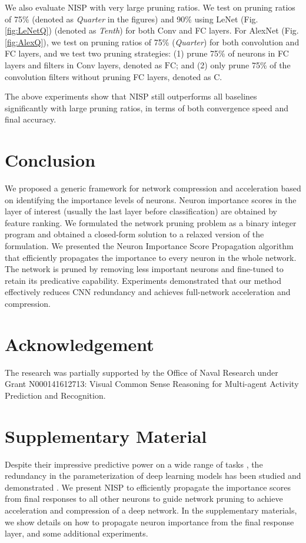 \documentclass[10pt,twocolumn,letterpaper]{article}
\begin{document}
We also evaluate NISP with very large pruning ratios. We test on pruning ratios of 75\% (denoted as \emph{Quarter} in the figures) and 90\% using LeNet (Fig. \ref{fig:LeNetQ}) (denoted as \emph{Tenth}) for both Conv and FC layers.
For AlexNet (Fig. \ref{fig:AlexQ}), we test on pruning ratios of 75\% (\emph{Quarter}) for both convolution and FC layers, and we test two pruning strategies: (1) prune 75\% of neurons in FC layers and filters in Conv layers, denoted as \emph{$\text{FC}$}; and (2) only prune 75\% of the convolution filters without pruning FC layers, denoted as \emph{$\text{C}$}.

The above experiments show that NISP still outperforms all baselines significantly with large pruning ratios, in terms of both convergence speed and final accuracy.



\section{Conclusion}
We proposed a generic framework for network compression and acceleration based on identifying the importance levels of neurons. Neuron importance scores in the layer of interest (usually the last layer before classification) are obtained by feature ranking. We formulated the network pruning problem as a binary integer program and obtained a closed-form solution to a relaxed version of the formulation. We presented the Neuron Importance Score Propagation algorithm that efficiently propagates the importance to every neuron in the whole network. The network is pruned by removing less important neurons and fine-tuned to retain its predicative capability. Experiments demonstrated that our method effectively reduces CNN redundancy and achieves full-network acceleration and compression.

\section*{Acknowledgement}
The research was partially supported by the Office of Naval Research under Grant N000141612713: Visual Common Sense Reasoning for Multi-agent Activity Prediction and Recognition.

\section{Supplementary Material}

Despite their impressive predictive power on a wide range of tasks \cite{faster, xu1,xu3,yu1,yu2,peng,yu3,yu6,yu7,xu2,yu4,yu5}, the redundancy in the parameterization of deep learning models has been studied and demonstrated \cite{PredictingParameters}. We present NISP to efficiently propagate the importance scores from final responses to all other neurons to guide network pruning to achieve acceleration and compression of a deep network.
In the supplementary materials, we show details on how to propagate neuron importance from the final response layer, and some additional experiments.
\end{document}
